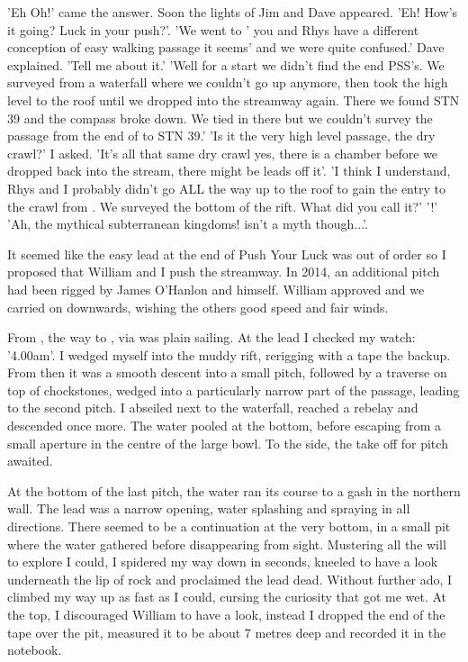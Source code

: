  'Eh Oh!' came the answer. Soon the lights of Jim and Dave appeared. 'Eh! How's it going? Luck in your push?'. 
'We went to '  you and Rhys have a different conception of easy walking passage it seems' and we were quite confused.' Dave explained.
'Tell me about it.'
'Well for a start we didn't find the end PSS's. We surveyed from a waterfall where we couldn't go up anymore, then took the high level to the roof until we dropped into the streamway again. There we found  STN 39 and the compass broke down. We tied in there but we couldn't survey the passage from the end of  to STN 39.'
 'Is it the very high level passage, the dry crawl?' I asked. 
'It's all that same dry crawl yes, there is a chamber before we dropped back into the stream, there might be leads off it'. 
'I think I understand, Rhys and I probably didn't go ALL the way up to the roof to gain the entry to the crawl from . We surveyed the bottom of the rift. What did you call it?'
'!'
'Ah, the mythical subterranean kingdoms!  isn't a myth though...'.

It seemed like the easy lead at the end of Push Your Luck was out of order so I proposed that William and I push the  streamway. In 2014, an additional pitch had been rigged by James O'Hanlon and himself. William approved and we carried on downwards, wishing the others good speed and fair winds. 

From , the way to , via  was plain sailing. At the lead I checked my watch: '4.00am'. I wedged myself into the muddy rift, rerigging with a tape the backup. From then it was a smooth descent into a small pitch, followed by a traverse on top of chockstones, wedged into a particularly narrow part of the passage, leading to the second pitch. I abseiled next to the waterfall, reached a rebelay and descended once more. The water pooled at the bottom, before escaping from a small aperture in the centre of the large bowl. To the side, the take off for  pitch awaited. 

At the bottom of the last pitch, the water ran its course to a gash in the northern wall. The lead was a narrow opening, water splashing and spraying in all directions. There seemed to be a continuation at the very bottom, in a small pit where the water gathered before disappearing from sight. Mustering all the will to explore I could, I spidered my way down in seconds, kneeled to have a look underneath the lip of rock and proclaimed the lead dead. Without further ado, I climbed my way up as fast as I could, cursing the curiosity that got me wet. At the top, I discouraged William to have a look, instead I dropped the end of the tape over the pit, measured it to be about 7 metres deep and recorded it in the notebook. 

